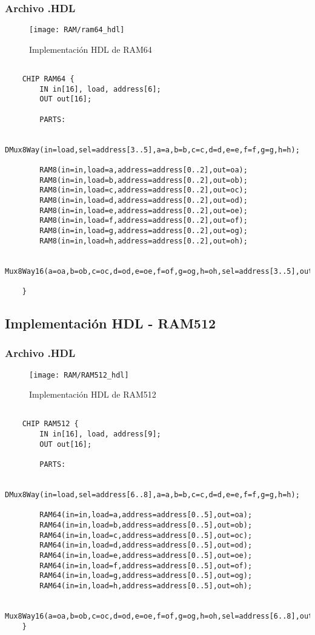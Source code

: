\documentclass[12pt]{article}
\begin{document}
	\subsubsection{Archivo .HDL}

	\begin{figure}[H]
	\centering
	\texttt{[image: RAM/ram64\_hdl]}
	\caption{Implementación HDL de RAM64}
	\label{fig:ram64hdl}
	\end{figure}
	\begin{lstlisting}

	CHIP RAM64 {
		IN in[16], load, address[6];
		OUT out[16];

		PARTS:

		DMux8Way(in=load,sel=address[3..5],a=a,b=b,c=c,d=d,e=e,f=f,g=g,h=h);

		RAM8(in=in,load=a,address=address[0..2],out=oa);
		RAM8(in=in,load=b,address=address[0..2],out=ob);
		RAM8(in=in,load=c,address=address[0..2],out=oc);
		RAM8(in=in,load=d,address=address[0..2],out=od);
		RAM8(in=in,load=e,address=address[0..2],out=oe);
		RAM8(in=in,load=f,address=address[0..2],out=of);
		RAM8(in=in,load=g,address=address[0..2],out=og);
		RAM8(in=in,load=h,address=address[0..2],out=oh);

		Mux8Way16(a=oa,b=ob,c=oc,d=od,e=oe,f=of,g=og,h=oh,sel=address[3..5],out=out);

	}

	\end{lstlisting}

	\subsection{Implementación HDL - RAM512}
	\subsubsection{Archivo .HDL}

	\begin{figure}[H]
	\centering
	\texttt{[image: RAM/RAM512\_hdl]}
	\caption{Implementación HDL de RAM512}
	\label{fig:ram512hdl}
	\end{figure}

	\begin{lstlisting}

	CHIP RAM512 {
		IN in[16], load, address[9];
		OUT out[16];

		PARTS:

		DMux8Way(in=load,sel=address[6..8],a=a,b=b,c=c,d=d,e=e,f=f,g=g,h=h);

		RAM64(in=in,load=a,address=address[0..5],out=oa);
		RAM64(in=in,load=b,address=address[0..5],out=ob);
		RAM64(in=in,load=c,address=address[0..5],out=oc);
		RAM64(in=in,load=d,address=address[0..5],out=od);
		RAM64(in=in,load=e,address=address[0..5],out=oe);
		RAM64(in=in,load=f,address=address[0..5],out=of);
		RAM64(in=in,load=g,address=address[0..5],out=og);
		RAM64(in=in,load=h,address=address[0..5],out=oh);

		Mux8Way16(a=oa,b=ob,c=oc,d=od,e=oe,f=of,g=og,h=oh,sel=address[6..8],out=out);
	}

	\end{lstlisting}
\end{document}
